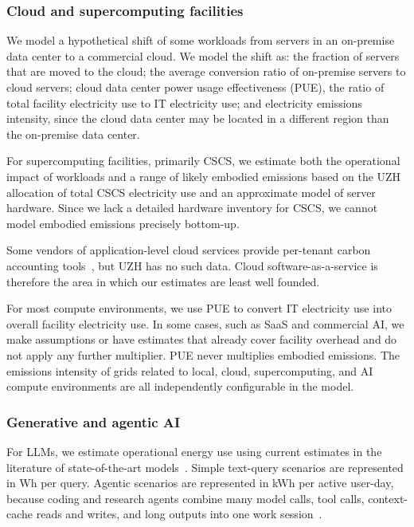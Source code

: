 \documentclass[11pt]{article}
\let\cite\parencite
\begin{document}
\subsubsection*{Cloud and supercomputing facilities}

We model a hypothetical shift of some workloads from servers in an on-premise
data center to a commercial cloud. We model the shift as: the fraction of
servers that are moved to the cloud; the average conversion ratio of on-premise
servers to cloud servers; cloud data center power usage effectiveness (PUE), the
ratio of total facility electricity use to IT electricity use; and electricity
emissions intensity, since the cloud data center may be located in a different
region than the on-premise data center.

For supercomputing facilities, primarily CSCS, we estimate both the operational
impact of workloads and a range of likely embodied emissions based on the UZH
allocation of total CSCS electricity use and an approximate model of server
hardware. Since we lack a detailed hardware inventory for CSCS, we cannot model
embodied emissions precisely bottom-up.

Some vendors of application-level cloud services provide per-tenant carbon
accounting tools~\cite{microsoft:m365:emissions,google:workspace:carbon}, but
UZH has no such data. Cloud software-as-a-service is therefore the area in which
our estimates are least well founded.

For most compute environments, we use PUE to convert IT electricity use into
overall facility electricity use. In some cases, such as SaaS and commercial AI,
we make assumptions or have estimates that already cover facility overhead and
do not apply any further multiplier. PUE never multiplies embodied emissions.
The emissions intensity of grids related to local, cloud, supercomputing, and AI
compute environments are all independently configurable in the model.

\subsubsection*{Generative and agentic AI}

For LLMs, we estimate operational energy use using current estimates in the
literature of state-of-the-art
models~\cite{devries2023growing,epoch2025howmuchenergydoeschatgptuse,jegham2025hungry}.
Simple text-query scenarios are represented in Wh per query. Agentic scenarios
are represented in kWh per active user-day, because coding and research agents
combine many model calls, tool calls, context-cache reads and writes, and long
outputs into one work
session~\cite{ritchie:ai:electricity:2026,couch:claude:code:energy}.
\end{document}
